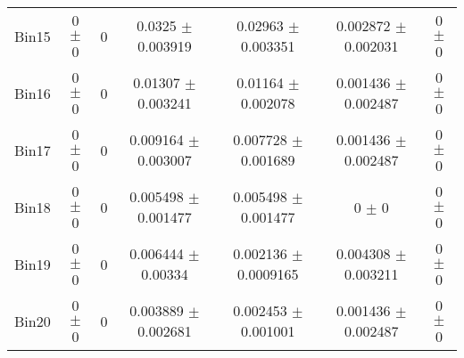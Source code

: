\begin{tabular}{@{\extracolsep{4pt}}lcccccc@{}}
     Bin15 & 0 $\pm$ 0 & 0 & 0.0325 $\pm$ 0.003919 & 0.02963 $\pm$ 0.003351 & 0.002872 $\pm$ 0.002031 & 0 $\pm$ 0 \\ 
     Bin16 & 0 $\pm$ 0 & 0 & 0.01307 $\pm$ 0.003241 & 0.01164 $\pm$ 0.002078 & 0.001436 $\pm$ 0.002487 & 0 $\pm$ 0 \\ 
     Bin17 & 0 $\pm$ 0 & 0 & 0.009164 $\pm$ 0.003007 & 0.007728 $\pm$ 0.001689 & 0.001436 $\pm$ 0.002487 & 0 $\pm$ 0 \\ 
     Bin18 & 0 $\pm$ 0 & 0 & 0.005498 $\pm$ 0.001477 & 0.005498 $\pm$ 0.001477 & 0 $\pm$ 0 & 0 $\pm$ 0 \\ 
     Bin19 & 0 $\pm$ 0 & 0 & 0.006444 $\pm$ 0.00334 & 0.002136 $\pm$ 0.0009165 & 0.004308 $\pm$ 0.003211 & 0 $\pm$ 0 \\ 
     Bin20 & 0 $\pm$ 0 & 0 & 0.003889 $\pm$ 0.002681 & 0.002453 $\pm$ 0.001001 & 0.001436 $\pm$ 0.002487 & 0 $\pm$ 0 \\ 
\hline\hline
  \end{tabular}

